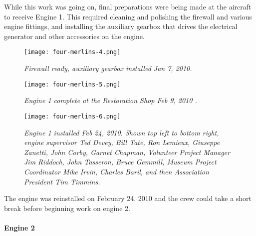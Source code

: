 While this work was going on, final preparations were being made at the
aircraft to receive Engine 1.  This required cleaning and polishing the
firewall and various engine fittings, and installing the auxiliary gearbox that
drives the electrical generator and other accessories on the engine.

\begin{figure}[htbp]
   \vspace{2em}
   \centering
   \texttt{[image: four-merlins-4.png]}
   \caption*{\small \em Firewall ready, auxiliary gearbox installed Jan 7,
2010.}
   \label{fig:tim}
\end{figure}



\begin{figure}[htbp]
   \vspace{2em}
   \centering
   \texttt{[image: four-merlins-5.png]}
   \caption*{\small \em Engine 1 complete at the Restoration Shop Feb 9, 2010
.}
   \label{fig:tim}
\end{figure}

\begin{figure}[htbp]
   \vspace{2em}
   \centering
   \texttt{[image: four-merlins-6.png]}
   \caption*{\small \em Engine 1 installed Feb 24, 2010. Shown top left to
bottom right, engine
supervisor Ted Devey,  Bill Tate, Ron Lemieux, Giuseppe Zanetti, John Corby,
Garnet Chapman, Volunteer Project Manager Jim Riddoch, John Tasseron, Bruce
Gemmill, Museum Project Coordinator Mike Irvin, Charles Baril, and then
Association President Tim Timmins.}
   \label{fig:tim}
\end{figure}

The engine was reinstalled on February 24, 2010 and the crew could take a short
break before beginning work on engine 2.

\paragraph*{Engine 2}\


